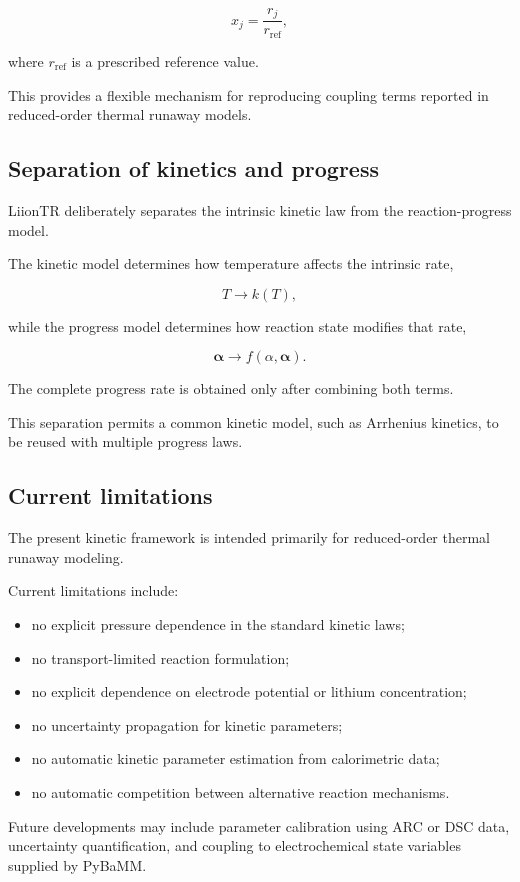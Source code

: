 \begin{equation}
    x_j
    =
    \frac{
        r_j
    }{
        r_{\mathrm{ref}}
    },
    \label{eq:normalized_remaining_fraction}
\end{equation}

where $r_{\mathrm{ref}}$ is a prescribed reference value.

This provides a flexible mechanism for reproducing coupling terms
reported in reduced-order thermal runaway models.


\subsection{Separation of kinetics and progress}

LiionTR deliberately separates the intrinsic kinetic law from the
reaction-progress model.

The kinetic model determines how temperature affects the intrinsic rate,

\begin{equation}
    T
    \longrightarrow
    k(T),
\end{equation}

while the progress model determines how reaction state modifies that
rate,

\begin{equation}
    \boldsymbol{\alpha}
    \longrightarrow
    f
    \left(
        \alpha,
        \boldsymbol{\alpha}
    \right).
\end{equation}

The complete progress rate is obtained only after combining both terms.

This separation permits a common kinetic model, such as Arrhenius
kinetics, to be reused with multiple progress laws.


\subsection{Current limitations}

The present kinetic framework is intended primarily for reduced-order
thermal runaway modeling.

Current limitations include:

\begin{itemize}
    \item no explicit pressure dependence in the standard kinetic laws;
    \item no transport-limited reaction formulation;
    \item no explicit dependence on electrode potential or lithium
          concentration;
    \item no uncertainty propagation for kinetic parameters;
    \item no automatic kinetic parameter estimation from calorimetric
          data;
    \item no automatic competition between alternative reaction
          mechanisms.
\end{itemize}

Future developments may include parameter calibration using ARC or DSC
data, uncertainty quantification, and coupling to electrochemical state
variables supplied by PyBaMM.